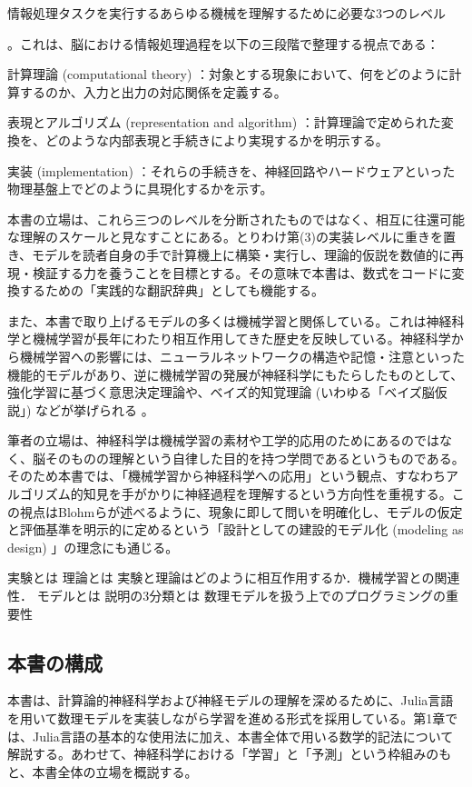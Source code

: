 \documentclass[titlepage]{ltjsbook}
\begin{document}
情報処理タスクを実行するあらゆる機械を理解するために必要な3つのレベル


。これは、脳における情報処理過程を以下の三段階で整理する視点である：

計算理論 (computational theory) ：対象とする現象において、何をどのように計算するのか、入力と出力の対応関係を定義する。

表現とアルゴリズム (representation and algorithm) ：計算理論で定められた変換を、どのような内部表現と手続きにより実現するかを明示する。

実装 (implementation) ：それらの手続きを、神経回路やハードウェアといった物理基盤上でどのように具現化するかを示す。

本書の立場は、これら三つのレベルを分断されたものではなく、相互に往還可能な理解のスケールと見なすことにある。とりわけ第(3)の実装レベルに重きを置き、モデルを読者自身の手で計算機上に構築・実行し、理論的仮説を数値的に再現・検証する力を養うことを目標とする。その意味で本書は、数式をコードに変換するための「実践的な翻訳辞典」としても機能する。

また、本書で取り上げるモデルの多くは機械学習と関係している。これは神経科学と機械学習が長年にわたり相互作用してきた歴史を反映している。神経科学から機械学習への影響には、ニューラルネットワークの構造や記憶・注意といった機能的モデルがあり、逆に機械学習の発展が神経科学にもたらしたものとして、強化学習に基づく意思決定理論や、ベイズ的知覚理論 (いわゆる「ベイズ脳仮説」) などが挙げられる \citep{Hassabis2017-zm}。

筆者の立場は、神経科学は機械学習の素材や工学的応用のためにあるのではなく、脳そのものの理解という自律した目的を持つ学問であるというものである。そのため本書では、「機械学習から神経科学への応用」という観点、すなわちアルゴリズム的知見を手がかりに神経過程を理解するという方向性を重視する。この視点はBlohmらが述べるように、現象に即して問いを明確化し、モデルの仮定と評価基準を明示的に定めるという「設計としての建設的モデル化 (modeling as design) 」の理念にも通じる。

実験とは
理論とは
実験と理論はどのように相互作用するか．機械学習との関連性．
モデルとは
説明の3分類とは
数理モデルを扱う上でのプログラミングの重要性

\subsection{本書の構成}
本書は、計算論的神経科学および神経モデルの理解を深めるために、Julia言語を用いて数理モデルを実装しながら学習を進める形式を採用している。第1章では、Julia言語の基本的な使用法に加え、本書全体で用いる数学的記法について解説する。あわせて、神経科学における「学習」と「予測」という枠組みのもと、本書全体の立場を概説する。
\end{document}
